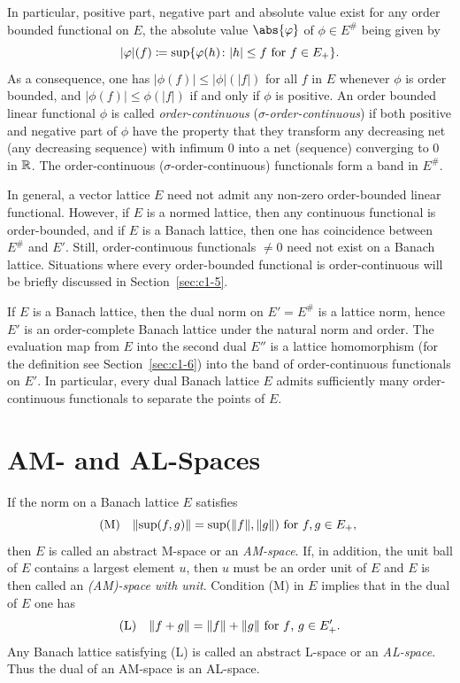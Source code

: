 In particular, positive part, negative part and absolute value exist for any order bounded functional on $ E $, the absolute value $\abs{\phi}$ of\/ $ \phi \in E^{\#} $ being given by
\[
	|\phi|(f) \coloneq \sup\{\phi(h) \colon |h| \leq f \text{ for $ f \in E_{+} $}\}.
\]
As a consequence, one has $ |\phi(f)| \leq |\phi|(|f|) $ for all $ f $ in $ E $ whenever $ \phi $ is order bounded, and $ |\phi(f)| \leq \phi(|f|) $ if and only if\/ $ \phi $ is positive.
An order bounded linear functional $ \phi $ is called \emph{order-continuous} ($ \sigma $-\emph{order-continuous}) if both positive and negative part of\/ $ \phi $ have the property that they transform any decreasing net (any decreasing sequence) with infimum $ 0 $ into a net (sequence) converging to $ 0 $ in $ \mathbb{R} $.
The order-continuous ($ \sigma $-order-continuous) functionals form a band in $ E^{\#} $.

In general, a vector lattice $ E $ need not admit any non-zero order-bounded linear functional.
However, if\/ $ E $ is a normed lattice, then any continuous functional is order-bounded, and if\/ $ E $ is a Banach lattice, then one has coincidence between $ E^{\#} $ and $ E' $.
Still, order-continuous functionals $ \neq 0 $ need not exist on a Banach lattice.
Situations where every order-bounded functional is order-continuous will be briefly discussed in Section~\ref{sec:c1-5}.

If\/ $ E $ is a Banach lattice, then the dual norm on $ E' = E^{\#} $ is a lattice norm, hence $ E' $ is an order-complete Banach lattice under the natural norm and order.
The evaluation map from $ E $ into the second dual $ E'' $ is a lattice homomorphism (for the definition see Section~\ref{sec:c1-6}) into the band of order-continuous functionals on $ E' $.
In particular, every dual Banach lattice $ E $ admits sufficiently many order-continuous functionals to separate the points of\/ $ E $.
\section{AM- and AL-Spaces}\label{sec:c1-4}%
%
If the norm on a Banach lattice $ E $ satisfies
\begin{equation*}\label{eq:c1-2}
	\mathrm{(M)} \quad \lVert \sup(f,g) \rVert = \sup(\lVert f \rVert,\|g\|) \text{ for $ f, g \in E_{+}$, }  
\end{equation*}
then $ E $ is called an abstract M-space or an \emph{AM-space}.
If, in addition, the unit ball of\/ $ E $ contains a largest element $ u $, then $ u $ must be an order unit of\/ $ E $ and $ E $ is then called an \emph{(AM)-space with unit}.
Condition (M) in $ E $ implies that in the dual of\/ $ E $ one has
\begin{equation*}\label{eq:c1-3}
	\mathrm{(L)} \quad \|f + g\| = \|f\| + \|g\| \text{ for $ f $, $ g \in E_{+}'$.} 
\end{equation*}
Any Banach lattice satisfying (L) is called an abstract L-space or an \emph{AL-space}.
Thus the dual of an AM-space is an AL-space.

